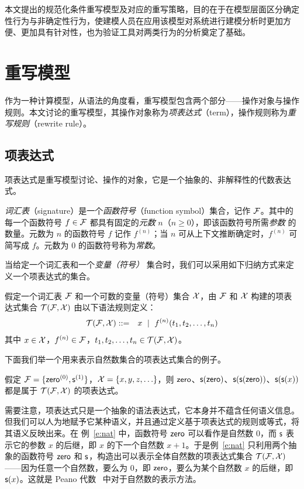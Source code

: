本文提出的规范化条件重写模型及对应的重写策略，目的在于在模型层面区分确定性行为与非确定性行为，使建模人员在应用该模型对系统进行建模分析时更加方便、更加具有针对性，也为验证工具对两类行为的分析奠定了基础。

\section{重写模型} 
\label{s:rewritesystem}

作为一种计算模型，从语法的角度看，重写模型包含两个部分——操作对象与操作规则。本文讨论的重写模型，其操作对象称为\emph{项表达式}（term），操作规则称为\emph{重写规则}（rewrite rule）。 

\subsection{项表达式}

项表达式是重写模型讨论、操作的对象，它是一个抽象的、非解释性的代数表达式。

\emph{词汇表}（signature）是一个\emph{函数符号}（function symbol）集合，记作 $\mathcal{F}$。其中的每一个函数符号 $f\in\mathcal{F}$ 都具有固定的\emph{元数} $n$（$n\ge 0$），即该函数符号所需\emph{参数} 的数量。元数为 $n$ 的函数符号 $f$ 记作 $f^{(n)}$；当 $n$ 可从上下文推断确定时，$f^{(n)}$ 可简写成 $f$。元数为 $0$ 的函数符号称为\emph{常数}。

当给定一个词汇表和一个\emph{变量（符号）} 集合时，我们可以采用如下归纳方式来定义一个项表达式的集合。

\begin{definition}[项表达式]
\label{d:term}
假定一个词汇表 $\mathcal{F}$ 和一个可数的变量（符号）集合 $\mathcal{X}$，由 $\mathcal{F}$ 和 $\mathcal{X}$ 构建的项表达式集合 $\mathcal{T}(\mathcal{F},\mathcal{X})$ 由以下语法规则定义：
\begin{eqnarray}
    \mathcal{T}(\mathcal{F},\mathcal{X}) & ::= & x ~\mid~ f^{(n)}(t_1,t_2,\ldots,t_n) \nonumber 
\end{eqnarray}
其中 $x\in\mathcal{X}$，$f^{(n)}\in\mathcal{F}$，$t_1,t_2,\ldots,t_n\in\mathcal{T}(\mathcal{F},\mathcal{X})$。
\end{definition}

下面我们举一个用来表示自然数集合的项表达式集合的例子。

\begin{example}
\label{e:nat}
假定 $\mathcal{F} = \{\operatorname{\mathsf{zero}}^{(0)}, \operatorname{\mathsf{s}}^{(1)}\}$，$\mathcal{X}=\{x,y,z,\ldots\}$，则 $\operatorname{\mathsf{zero}}$、$\operatorname{\mathsf{s}}(\operatorname{\mathsf{zero}})$、$\operatorname{\mathsf{s}}(\operatorname{\mathsf{s}}(\operatorname{\mathsf{zero}}))$、$\operatorname{\mathsf{s}}(\operatorname{\mathsf{s}}(x))$ 都是属于 $\mathcal{T}(\mathcal{F},\mathcal{X})$ 的项表达式。
\end{example}

需要注意，项表达式只是一个抽象的语法表达式，它本身并不蕴含任何语义信息。但我们可以人为地赋予它某种语义，并且通过定义基于项表达式的规则或等式，将其语义反映出来。在
例~\ref{e:nat} 中，函数符号 $\operatorname{\mathsf{zero}}$ 可以看作是自然数 $0$，而 $\operatorname{\mathsf{s}}$ 表示它的参数 $x$ 的后继，即 $x$ 的下一个自然数 $x+1$。于是例~\ref{e:nat} 只利用两个抽象的函数符号 $\operatorname{\mathsf{zero}}$ 和 $\operatorname{\mathsf{s}}$，构造出可以表示全体自然数的项表达式集合 $\mathcal{T}(\mathcal{F},\mathcal{X})$——因为任意一个自然数，要么为 $0$，即 $\operatorname{\mathsf{zero}}$，要么为某个自然数 $x$ 的后继，即 $\operatorname{\mathsf{s}}(x)$。这就是 Peano 代数~\cite{Kaye1991-KAYMOP} 中对于自然数的表示方法。

